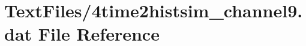 \hypertarget{4time2histsim__channel9_8dat}{}\section{Text\+Files/4time2histsim\+\_\+channel9.dat File Reference}
\label{4time2histsim__channel9_8dat}
